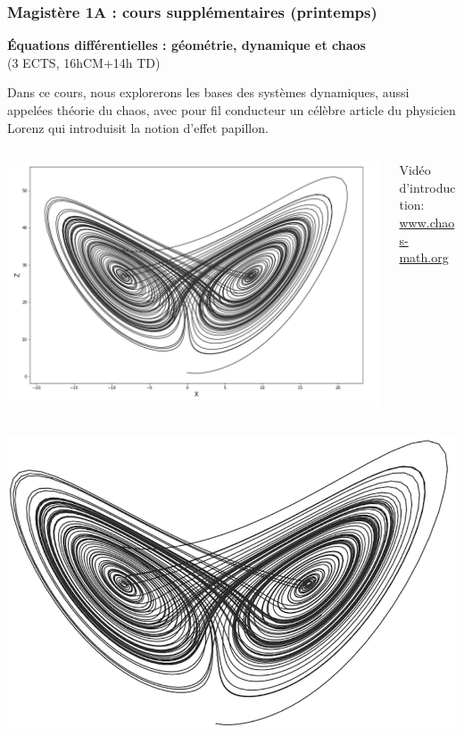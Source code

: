 \documentclass[slidetop,11pt]{beamer}
\begin{document}
\begin{frame}
\frametitle{Magistère 1A : cours supplémentaires (printemps)}

\textbf{Équations différentielles : géométrie, dynamique et chaos}\\
(3 ECTS, 16hCM+14h TD)

Dans ce cours, nous explorerons les bases des systèmes dynamiques, aussi appelées \og théorie du chaos\fg, avec pour fil conducteur un célèbre article du physicien Lorenz qui introduisit la notion d'effet papillon.
\begin{columns}[c]
\begin{column}{6cm}
\includegraphics[scale=.2]{images/Lorenz-Attractor-in-2D-space.png}
\end{column}
\begin{column}{5cm}
Vidéo d'introduction: \\
\url{www.chaos-math.org}\\
\end{column}
\end{columns}
\end{frame}

\begin{frame}
\begin{center}
\includegraphics[scale=.35]{images/Lorenz.png}
\end{center}
\end{frame}
\end{document}
